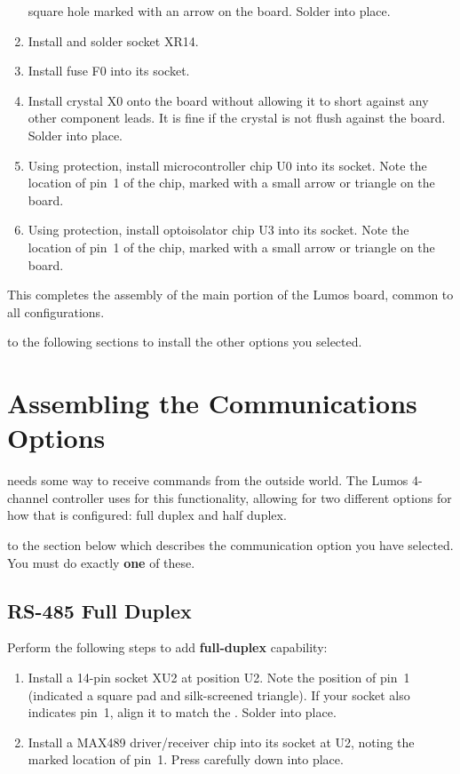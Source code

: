 \documentclass[letterpaper,twoside,onecolumn,openright,final]{memoir}
\begin{document}
\begin{enumerate}
	square hole marked with an arrow on the board.  Solder into place.
\item	Install and solder socket XR14.
\item	Install fuse F0 into its socket.
\item 	Install crystal X0 onto the board without allowing it to short
	against any other component leads.  It is fine if the crystal
	is not flush against the board.  Solder into place.
\item	Using  protection, install microcontroller chip U0 into its socket.  Note the location of pin~1 of the chip, marked with a small 
	arrow or triangle on the board.
\item	Using  protection, install optoisolator chip U3 into its socket.  Note the location of pin~1 of the chip, marked with a small 
	arrow or triangle on the board.
\end{enumerate}

This completes the assembly of the main portion of the Lumos board, common to all configurations.

\bigskip

 to the following sections
to install the other options you selected.

\chapter{Assembling the Communications Options}\label{ch:comms}
 needs some way to receive commands from the outside
world.  The Lumos 4-channel  controller uses  for this functionality,
allowing for two different options for how that is configured:
full duplex and half duplex.

\bigskip

 to the section below which describes the communication option
you have selected.  You must do exactly {\bfseries one} of these.

\section{RS-485 Full Duplex}
Perform the following steps to add {\bfseries full-duplex}  capability:
\begin{enumerate}
\item
	Install a 14-pin  socket XU2 at position U2.  Note the position of pin~1 (indicated
        a square pad and silk-screened triangle).  If your socket also indicates pin~1, align
	it to match the . Solder into place.
\item	Install a MAX489 driver/receiver chip into its socket at U2, noting the marked location
	of pin~1.  Press carefully down into place.
\end{enumerate}
\end{document}
